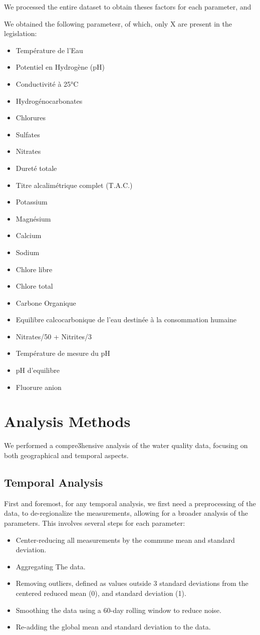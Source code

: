 \documentclass{article}
\begin{document}
We processed the entire dataset to obtain theses factors for each parameter, and 

We obtained the following parametesr, of which, only X are present in the legislation:
\begin{itemize}
    \item Température de l'Eau
    \item Potentiel en Hydrogène (pH)
    \item Conductivité à 25°C
    \item Hydrogénocarbonates
    \item Chlorures
    \item Sulfates
    \item Nitrates
    \item Dureté totale
    \item Titre alcalimétrique complet (T.A.C.)
    \item Potassium
    \item Magnésium
    \item Calcium
    \item Sodium
    \item Chlore libre
    \item Chlore total
    \item Carbone Organique
    \item Equilibre calcocarbonique de l’eau destinée à la consommation humaine
    \item Nitrates/50 + Nitrites/3
    \item Température de mesure du pH
    \item pH d'equilibre
    \item Fluorure anion
\end{itemize}

\newpage
\section{Analysis Methods}
We performed a compre3hensive analysis of the water quality data, focusing on both geographical and temporal aspects.

\subsection{Temporal Analysis}

First and foremost, for any temporal analysis, we first need a preprocessing of the data, to de-regionalize the measurements, allowing for a broader analysis of the parameters.
This involves several steps for each parameter:
\begin{itemize}
    \item Center-reducing all measurements by the commune mean and standard deviation.
    \item Aggregating The data.
    \item Removing outliers, defined as values outside 3 standard deviations from the centered reduced mean (0), and standard deviation (1).
    \item Smoothing the data using a 60-day rolling window to reduce noise.
    \item Re-adding the global mean and standard deviation to the data.
\end{itemize}
\end{document}
